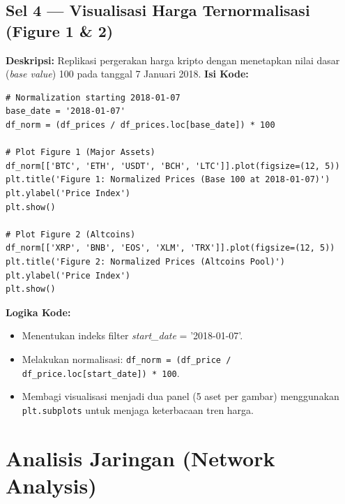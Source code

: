 \documentclass[12pt, a4paper]{article}
\begin{document}
\subsection{Sel 4 — Visualisasi Harga Ternormalisasi (Figure 1 \& 2)}
\textbf{Deskripsi:} Replikasi pergerakan harga kripto dengan menetapkan nilai dasar (\textit{base value}) 100 pada tanggal 7 Januari 2018.
\textbf{Isi Kode:}
\begin{lstlisting}
# Normalization starting 2018-01-07
base_date = '2018-01-07'
df_norm = (df_prices / df_prices.loc[base_date]) * 100

# Plot Figure 1 (Major Assets)
df_norm[['BTC', 'ETH', 'USDT', 'BCH', 'LTC']].plot(figsize=(12, 5))
plt.title('Figure 1: Normalized Prices (Base 100 at 2018-01-07)')
plt.ylabel('Price Index')
plt.show()

# Plot Figure 2 (Altcoins)
df_norm[['XRP', 'BNB', 'EOS', 'XLM', 'TRX']].plot(figsize=(12, 5))
plt.title('Figure 2: Normalized Prices (Altcoins Pool)')
plt.ylabel('Price Index')
plt.show()
\end{lstlisting}
\textbf{Logika Kode:} 
\begin{itemize}
    \item Menentukan indeks filter \textit{start\_date} = '2018-01-07'.
    \item Melakukan normalisasi: \texttt{df\_norm = (df\_price / df\_price.loc[start\_date]) * 100}.
    \item Membagi visualisasi menjadi dua panel (5 aset per gambar) menggunakan \texttt{plt.subplots} untuk menjaga keterbacaan tren harga.
\end{itemize}

\section{Analisis Jaringan (Network Analysis)}
\end{document}
